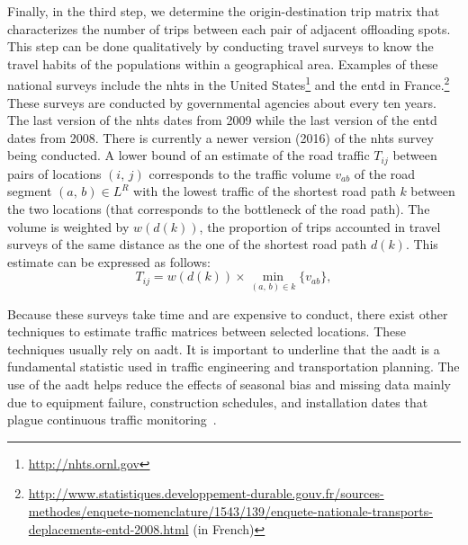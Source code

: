 Finally, in the third step, we determine the origin-destination trip matrix that characterizes the number of trips between each pair of adjacent offloading spots. This step can be done qualitatively by conducting travel surveys to know the travel habits of the populations within a geographical area. Examples of these national surveys include the \acrfull{nhts} in the United States\footnote{\url{http://nhts.ornl.gov}} and the \acrfull{entd} in France.\footnote{\url{http://www.statistiques.developpement-durable.gouv.fr/sources-methodes/enquete-nomenclature/1543/139/enquete-nationale-transports-deplacements-entd-2008.html} (in French)} These surveys are conducted by governmental agencies about every ten years. The last version of the \acrshort{nhts} dates from 2009 while the last version of the \acrshort{entd} dates from 2008. There is currently a newer version (2016) of the \acrshort{nhts} survey being conducted. A lower bound of an estimate of the road traffic $T_{ij}$ between pairs of locations $(i,\,j)$ corresponds to the traffic volume $v_{ab}$ of the road segment $(a,\,b)\in L^{R}$ with the lowest traffic of the shortest road path $k$ between the two locations (\ie that corresponds to the bottleneck of the road path). The volume is weighted by $w(d(k))$, the proportion of trips accounted in travel surveys of the same distance as the one of the shortest road path $d(k)$. This estimate can be expressed as follows:
\begin{equation}
    T_{ij} = w(d(k))\times\min_{(a,\,b)\in k}\{v_{ab}\},
\end{equation}

Because these surveys take time and are expensive to conduct, there exist other techniques to estimate traffic matrices between selected locations. These techniques usually rely on \acrfull{aadt}. It is important to underline that the \acrshort{aadt} is a fundamental statistic used in traffic engineering and transportation planning. The use of the \acrshort{aadt} helps reduce the effects of seasonal bias and missing data mainly due to equipment failure, construction schedules, and installation dates that plague continuous traffic monitoring~\cite{wright1997variability}.

